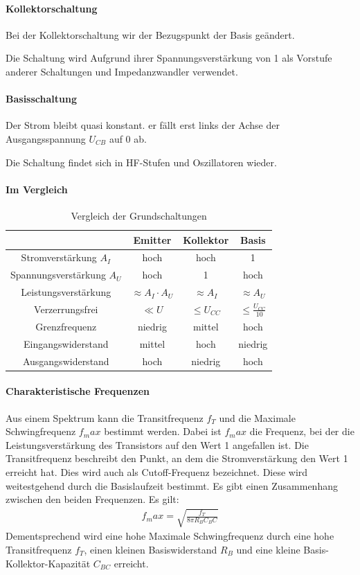 	\paragraph{Kollektorschaltung}
	Bei der Kollektorschaltung wir der Bezugspunkt der Basis geändert.
	
	Die Schaltung wird Aufgrund ihrer Spannungsverstärkung von 1 als Vorstufe anderer Schaltungen und Impedanzwandler verwendet.
	
	\paragraph{Basisschaltung}
	Der Strom bleibt quasi konstant. er fällt erst links der Achse der Ausgangsspannung $U_{CB}$ auf 0 ab. 
	
	Die Schaltung findet sich in HF-Stufen und Oszillatoren wieder.
	
	\paragraph{Im Vergleich}
	\begin{table}
		\centering
		\begin{tabular}{c|c|c|c}
			&Emitter & Kollektor & Basis\\
			\hline
			Stromverstärkung $A_I$& hoch & hoch & 1\\
			Spannungsverstärkung $A_U$& hoch & 1 & hoch \\
			Leistungsverstärkung & $\approx A_I\cdot A_U$ & $\approx A_I$ & $\approx A_U$\\
			Verzerrungsfrei & $\ll U$ & $\le U_{CC}$ & $\le \frac{U_{CC}}{10}$\\
			Grenzfrequenz & niedrig & mittel & hoch \\
			Eingangswiderstand & mittel & hoch & niedrig\\
			Ausgangswiderstand & hoch & niedrig & hoch \\
		\end{tabular}
		\caption{Vergleich der Grundschaltungen}
	\end{table}

	\paragraph{Charakteristische Frequenzen} Aus einem Spektrum kann die Transitfrequenz $f_T$ und die Maximale Schwingfrequenz $f_max$ bestimmt werden. Dabei ist $f_max$ die Frequenz, bei der die Leistungsverstärkung des Transistors auf den Wert 1 angefallen ist. Die Transitfrequenz beschreibt den Punkt, an dem die Stromverstärkung den Wert 1 erreicht hat. Dies wird auch als Cutoff-Frequenz bezeichnet. Diese wird weitestgehend durch die Basislaufzeit bestimmt. Es gibt einen Zusammenhang zwischen den beiden Frequenzen. Es gilt:
	\begin{align}
		f_max = \sqrt{\frac{f_T}{8\pi R_B C_BC}}
	\end{align}
	Dementsprechend wird eine hohe Maximale Schwingfrequenz durch eine hohe Transitfrequenz $f_T$, einen kleinen Basiswiderstand $R_B$ und eine kleine Basis-Kollektor-Kapazität $C_{BC}$ erreicht.
	
